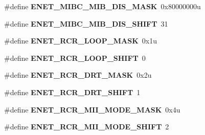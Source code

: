 \begin{DoxyCompactItemize}
\item 
\hypertarget{group___e_n_e_t___register___masks_ga0e0763360e871b1a1f7e989f5695ece3}{}\#define {\bfseries E\+N\+E\+T\+\_\+\+M\+I\+B\+C\+\_\+\+M\+I\+B\+\_\+\+D\+I\+S\+\_\+\+M\+A\+S\+K}~0x80000000u\label{group___e_n_e_t___register___masks_ga0e0763360e871b1a1f7e989f5695ece3}

\item 
\hypertarget{group___e_n_e_t___register___masks_gadb11718d0241c2e441cc2eb36d9d9e6e}{}\#define {\bfseries E\+N\+E\+T\+\_\+\+M\+I\+B\+C\+\_\+\+M\+I\+B\+\_\+\+D\+I\+S\+\_\+\+S\+H\+I\+F\+T}~31\label{group___e_n_e_t___register___masks_gadb11718d0241c2e441cc2eb36d9d9e6e}

\item 
\hypertarget{group___e_n_e_t___register___masks_ga0d93b88f79d8bdd51bb415a1ff84dd65}{}\#define {\bfseries E\+N\+E\+T\+\_\+\+R\+C\+R\+\_\+\+L\+O\+O\+P\+\_\+\+M\+A\+S\+K}~0x1u\label{group___e_n_e_t___register___masks_ga0d93b88f79d8bdd51bb415a1ff84dd65}

\item 
\hypertarget{group___e_n_e_t___register___masks_ga282373d2872e9226759336d35bb56c0a}{}\#define {\bfseries E\+N\+E\+T\+\_\+\+R\+C\+R\+\_\+\+L\+O\+O\+P\+\_\+\+S\+H\+I\+F\+T}~0\label{group___e_n_e_t___register___masks_ga282373d2872e9226759336d35bb56c0a}

\item 
\hypertarget{group___e_n_e_t___register___masks_ga58442922cdcafe3b6d538552b38f4899}{}\#define {\bfseries E\+N\+E\+T\+\_\+\+R\+C\+R\+\_\+\+D\+R\+T\+\_\+\+M\+A\+S\+K}~0x2u\label{group___e_n_e_t___register___masks_ga58442922cdcafe3b6d538552b38f4899}

\item 
\hypertarget{group___e_n_e_t___register___masks_ga6fd2d01580d2b9cbe640d0af201ea723}{}\#define {\bfseries E\+N\+E\+T\+\_\+\+R\+C\+R\+\_\+\+D\+R\+T\+\_\+\+S\+H\+I\+F\+T}~1\label{group___e_n_e_t___register___masks_ga6fd2d01580d2b9cbe640d0af201ea723}

\item 
\hypertarget{group___e_n_e_t___register___masks_ga117cf78ff620b783e4dc4156ad1a735b}{}\#define {\bfseries E\+N\+E\+T\+\_\+\+R\+C\+R\+\_\+\+M\+I\+I\+\_\+\+M\+O\+D\+E\+\_\+\+M\+A\+S\+K}~0x4u\label{group___e_n_e_t___register___masks_ga117cf78ff620b783e4dc4156ad1a735b}

\item 
\hypertarget{group___e_n_e_t___register___masks_gaef1228d5d365350c81bf4bf641ad3dd4}{}\#define {\bfseries E\+N\+E\+T\+\_\+\+R\+C\+R\+\_\+\+M\+I\+I\+\_\+\+M\+O\+D\+E\+\_\+\+S\+H\+I\+F\+T}~2\label{group___e_n_e_t___register___masks_gaef1228d5d365350c81bf4bf641ad3dd4}


\end{DoxyCompactItemize}
